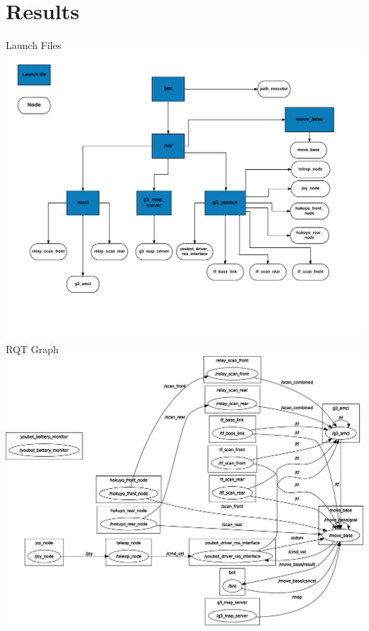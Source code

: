 
\section{Results}
\begin{frame}{Launch Files}
    \centering
    \includegraphics[width=\textwidth]{gfx/launchfile_updated.png}
\end{frame}
\begin{frame}{RQT Graph}
    \centering
    \includegraphics[width=\textwidth]{gfx/rosgraph}
\end{frame}

